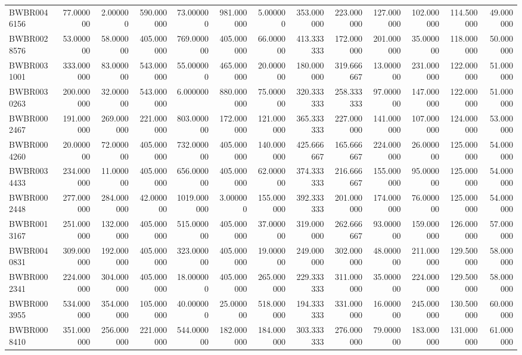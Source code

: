 \begin{longtable}{lrrrrrrrrrrrr}
BWBR0046156 & 77.000000 & 2.000000 & 590.000000 & 73.000000 & 981.000000 & 5.000000 & 353.000000 & 223.000000 & 127.000000 & 102.000000 & 114.500000 & 49.000000 \\
BWBR0028576 & 53.000000 & 58.000000 & 405.000000 & 769.000000 & 405.000000 & 66.000000 & 413.333333 & 172.000000 & 201.000000 & 35.000000 & 118.000000 & 50.000000 \\
BWBR0031001 & 333.000000 & 83.000000 & 543.000000 & 55.000000 & 465.000000 & 20.000000 & 180.000000 & 319.666667 & 13.000000 & 231.000000 & 122.000000 & 51.000000 \\
BWBR0030263 & 200.000000 & 32.000000 & 543.000000 & 6.000000 & 880.000000 & 75.000000 & 320.333333 & 258.333333 & 97.000000 & 147.000000 & 122.000000 & 51.000000 \\
BWBR0002467 & 191.000000 & 269.000000 & 221.000000 & 803.000000 & 172.000000 & 121.000000 & 365.333333 & 227.000000 & 141.000000 & 107.000000 & 124.000000 & 53.000000 \\
BWBR0004260 & 20.000000 & 72.000000 & 405.000000 & 732.000000 & 405.000000 & 140.000000 & 425.666667 & 165.666667 & 224.000000 & 26.000000 & 125.000000 & 54.000000 \\
BWBR0034433 & 234.000000 & 11.000000 & 405.000000 & 656.000000 & 405.000000 & 62.000000 & 374.333333 & 216.666667 & 155.000000 & 95.000000 & 125.000000 & 54.000000 \\
BWBR0002448 & 277.000000 & 284.000000 & 42.000000 & 1019.000000 & 3.000000 & 155.000000 & 392.333333 & 201.000000 & 174.000000 & 76.000000 & 125.000000 & 54.000000 \\
BWBR0013167 & 251.000000 & 132.000000 & 405.000000 & 515.000000 & 405.000000 & 37.000000 & 319.000000 & 262.666667 & 93.000000 & 159.000000 & 126.000000 & 57.000000 \\
BWBR0040831 & 309.000000 & 192.000000 & 405.000000 & 323.000000 & 405.000000 & 19.000000 & 249.000000 & 302.000000 & 48.000000 & 211.000000 & 129.500000 & 58.000000 \\
BWBR0002341 & 224.000000 & 304.000000 & 405.000000 & 18.000000 & 405.000000 & 265.000000 & 229.333333 & 311.000000 & 35.000000 & 224.000000 & 129.500000 & 58.000000 \\
BWBR0003955 & 534.000000 & 354.000000 & 105.000000 & 40.000000 & 25.000000 & 518.000000 & 194.333333 & 331.000000 & 16.000000 & 245.000000 & 130.500000 & 60.000000 \\
BWBR0008410 & 351.000000 & 256.000000 & 221.000000 & 544.000000 & 182.000000 & 184.000000 & 303.333333 & 276.000000 & 79.000000 & 183.000000 & 131.000000 & 61.000000 \\

\end{longtable}
